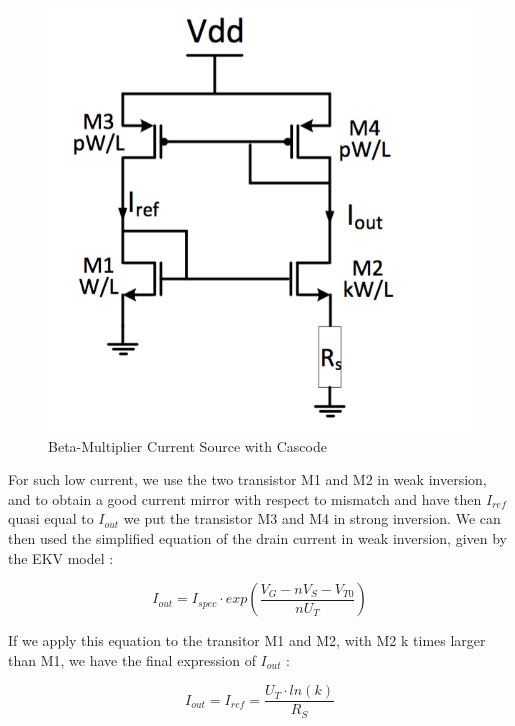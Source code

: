 \documentclass[11pt,a4paper]{report}
\begin{document}
\begin{figure}[h]
  \begin{center}
    \includegraphics[scale=0.25]{photo/beta_multiplier}
  \end{center}
  \caption{Beta-Multiplier Current Source with Cascode}
  \label{beta_m}
\end{figure}

For such low current, we use the two transistor M1 and M2 in weak inversion, and to obtain a good current mirror with respect to mismatch and have then $I_{ref}$ quasi equal to $I_{out}$ we put the transistor M3 and M4 in strong inversion. We can then used the simplified equation of the drain current in weak inversion, given by the EKV model : 

\begin{equation}
  I_{out} = I_{spec} \cdot exp \left( \frac{V_G - n V_S - V_{T0}}{n U_T}\right)
\end{equation}

If we apply this equation to the transitor M1 and M2, with M2 k times larger than M1, we have the final expression of $I_{out}$ :

\begin{equation}
  I_{out} = I_{ref} = \frac{U_T \cdot ln(k)}{R_S}
\end{equation}
\end{document}
